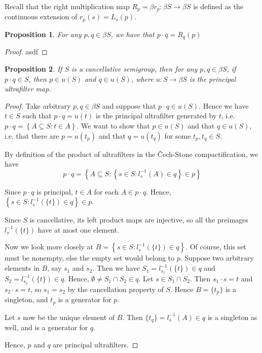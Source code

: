 \documentclass[11pt,letterpaper]{article}
\newtheorem{prop}{Proposition}
\newcommand{\inv}{^{-1}}
\newcommand{\intersn}{\cap}
\newcommand{\setof}[1]{\left\{#1\right\}}
\newcommand{\cechstone}{\v{C}ech-Stone}
\begin{document}
Recall that the right multiplication map
$R_p = \beta r_p : \beta S \to \beta S$ is defined as the continuous extension
of $r_p(s) = L_s(p)$.

\begin{prop}
    For any $p, q \in \beta S$, we have that $p \cdot q = R_q (p)$
\end{prop}

\begin{proof}
    asdf
\end{proof}

\begin{prop}
    If $S$ is a cancellative semigroup,
    then for any $p, q \in \beta S$,
    if $p \cdot q \in S$, then $p \in u(S)$ and $q \in u(S)$,
    where $u : S \to \beta S$ is the principal ultrafilter map.
\end{prop}

\begin{proof}
    Take arbitrary $p, q \in \beta S$ and suppose that $p \cdot q \in u(S)$.
    Hence we have $t \in S$ such that $p \cdot q = u(t)$ is the principal
    ultrafilter generated by $t$,
    i.e. $p \cdot q = \setof{A \subseteq S : t \in A}$.
    We want to show that $p \in u(S)$ and that $q \in u(S)$,
    i.e. that there are $p = u(t_p)$ and that $q = u(t_q)$
    for some $t_p, t_q \in S$.

    By definition of the product of ultrafilters in the \cechstone{}
    compactification, we have
    \begin{equation*}
        p \cdot q = \setof{
            A \subseteq S :
            \setof{
                s \in S :
                l_s\inv(A) \in q
            }
            \in p
        }
    \end{equation*}

    Since $p \cdot q$ is principal, $t \in A$ for each $A \in p \cdot q$.
    Hence, $\setof{s \in S : l_s\inv(\{t\}) \in q} \in p$.

    Since $S$ is cancellative, its left product maps are injective,
    so all the preimages $l_s\inv(\{t\})$ have at most one element.

    Now we look more closely at
    $B = \setof{s \in S : l_s\inv(\{t\}) \in q}$.
    Of course, this set must be nonempty, else the empty set would belong to
    $p$.
    Suppose two arbitrary elements in $B$, say $s_1$ and $s_2$.
    Then we have $S_1 = l_{s_1}\inv(\{t\}) \in q$
    and $S_2 = l_{s_2}\inv(\{t\}) \in q$.
    Hence, $\emptyset \neq S_1 \intersn S_2 \in q$.
    Let $s \in S_1 \intersn S_2$. Then $s_1 \cdot s = t$ and $s_2 \cdot s = t$,
    so $s_1 = s_2$ by the cancellation property of $S$.
    Hence $B = \{t_p\}$ is a singleton, and $t_p$ is a generator for $p$.

    Let $s$ now be the unique element of $B$.
    Then $\{t_q\} = l_s\inv(A) \in q$ is a singleton as well,
    and is a generator for $q$.

    Hence, $p$ and $q$ are principal ultrafilters.
\end{proof}
\end{document}
